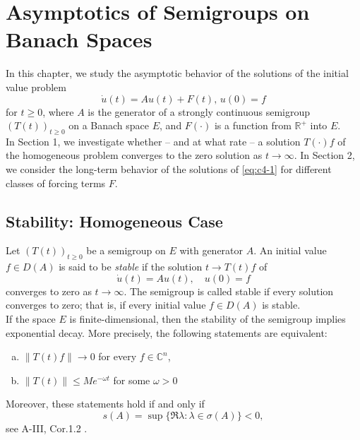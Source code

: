 \chapter{Asymptotics of Semigroups on Banach Spaces}\label{chap:c4}
In this chapter, we study the asymptotic behavior of the solutions of the initial value problem
\begin{equation}\label{eq:c4-1}
\dot{u}(t) = Au(t) + F(t), \, u(0) = f \tag{*}
\end{equation}
for \( t \geq 0 \), where \( A \) is the generator of a strongly continuous semigroup \( (T(t))_{t \geq 0} \) on a Banach space \( E \), and \( F(\cdot) \) is a function from \( \mathbb{R}^{+} \) into \( E \).\\
\noindent
In Section 1, we investigate whether -- and at what rate -- a solution \( T(\cdot)f \) of the homogeneous problem converges to the zero solution as \( t \to \infty \). 
In Section 2, we consider the long-term behavior of the solutions of \eqref{eq:c4-1} for different classes of forcing terms \( F \).
\section{Stability: Homogeneous Case}\label{sec:c4-1}
Let \( (T(t))_{t \geq 0} \) be a semigroup on \( E \) with generator \( A \).
An initial value \( f \in D(A) \) is said to be \emph{stable} if the solution \( t \to T(t)f \) of
\begin{equation}\label{eq:c4-2}
\dot{u}(t) = Au(t), \quad u(0) = f \tag{ACP}
\end{equation}
converges to zero as \( t \to \infty \). 
The semigroup is called stable if every solution converges to zero; that is, if every initial value \( f \in D(A) \) is stable.
\\
\noindent
If the space \( E \) is finite-dimensional, then the stability of the semigroup implies exponential decay. 
More precisely, the following statements are equivalent:
\begin{enumerate}[(a)]
\item \( \|T(t)f\| \to 0 \) for every \( f \in \mathbb{C}^{n} \),
\item \( \|T(t)\| \leq Me^{-\omega t} \) for some \( \omega > 0 \)
\end{enumerate}
Moreover, these statements hold if and only if
\[
s(A) = \sup\{\Re \lambda : \lambda \in \sigma(A)\} < 0,
\]
see A-III, Cor.1.2 .
\goodbreak

